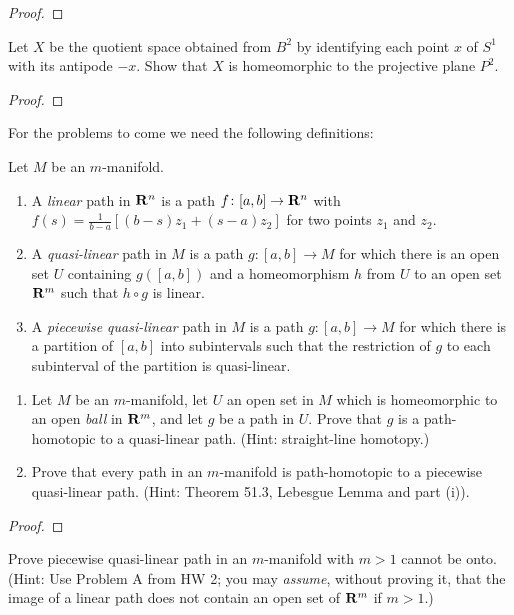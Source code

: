 \begin{proof}
\end{proof}
\newpage
\begin{problem}[Munkres \S60, Ex.\,2]
Let $X$ be the quotient space obtained from $B^2$ by identifying each point
$x$ of $S^1$ with its antipode $-x$. Show that $X$ is homeomorphic to the
projective plane $P^2$.
\end{problem}
\begin{proof}
\end{proof}
\newpage
\thispagestyle{empty}
For the problems to come we need the following definitions:
\begin{definition*}
Let $M$ be an  $m$-manifold.
\begin{enumerate}[label=(\roman*)]
\item A \emph{linear} path in $\mathbf{R}^n$ is a path $f\colon[a,b]\to\mathbf{R}^n$ with
  $f(s)=\tfrac{1}{b-a}[(b-s)z_1+(s-a)z_2]$ for two points $z_1$ and $z_2$.
\item A \emph{quasi-linear} path in $M$ is a path $g\colon[a,b]\to M$ for
  which there is an open set $U$ containing $g([a,b])$ and a homeomorphism
  $h$ from $U$ to an open set $\mathbf{R}^m$ such that $h\circ g$ is linear.
\item A \emph{piecewise quasi-linear} path in $M$ is a path
  $g\colon[a,b]\to M$ for which there is a partition of $[a,b]$ into
  subintervals such that the restriction of $g$ to each subinterval of the
  partition is  quasi-linear.
\end{enumerate}
\end{definition*}
\newpage
\begin{problem}[A]
\begin{enumerate}[label=(\roman*)]
\item Let $M$ be an $m$-manifold, let $U$ an open set in $M$ which is
  homeomorphic to an open \emph{ball} in $\mathbf{R}^m$, and let $g$ be a path in
  $U$. Prove that $g$ is a path-homotopic to a quasi-linear path. (Hint:
  straight-line homotopy.)
\item Prove that every path in an $m$-manifold is path-homotopic to a
  piecewise quasi-linear path. (Hint: Theorem 51.3, Lebesgue Lemma and part
  (i)).
\end{enumerate}
\end{problem}
\begin{proof}
\end{proof}
\newpage
\begin{problem}[B]
Prove piecewise quasi-linear path in an $m$-manifold with $m>1$ cannot be
onto. (Hint: Use Problem A from HW 2; you may \emph{assume}, without
proving it, that the image of a linear path does not contain an open set of
$\mathbf{R}^m$ if $m>1$.)
\end{problem}
